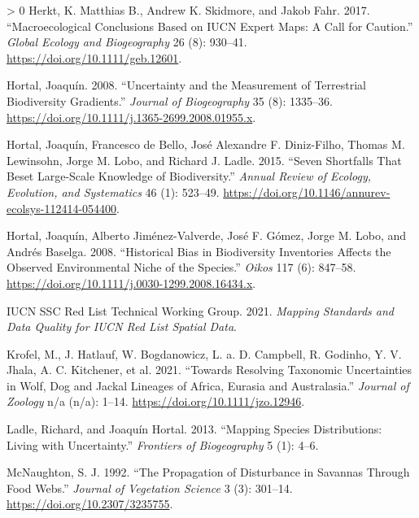 \documentclass[10pt,oneside]{article}
\newlength{\cslhangindent}
\newenvironment{CSLReferences}[3] %
 {%
  \setlength{\parindent}{0pt}
  \ifodd #1 \everypar{\setlength{\hangindent}{\cslhangindent}}\ignorespaces\fi
  \ifnum #2 > 0
  \setlength{\parskip}{#2\baselineskip}
  \fi
 }%
 {}
\begin{document}
\begin{CSLReferences}{1}{0}
\leavevmode\hypertarget{ref-Herkt2017MacCon}{}%
Herkt, K. Matthias B., Andrew K. Skidmore, and Jakob Fahr. 2017.
{``Macroecological Conclusions Based on IUCN Expert Maps: A Call for
Caution.''} \emph{Global Ecology and Biogeography} 26 (8): 930--41.
\url{https://doi.org/10.1111/geb.12601}.

\leavevmode\hypertarget{ref-Hortal2008UncMea}{}%
Hortal, Joaquín. 2008. {``Uncertainty and the Measurement of Terrestrial
Biodiversity Gradients.''} \emph{Journal of Biogeography} 35 (8):
1335--36. \url{https://doi.org/10.1111/j.1365-2699.2008.01955.x}.

\leavevmode\hypertarget{ref-Hortal2015SevSho}{}%
Hortal, Joaquín, Francesco de Bello, José Alexandre F. Diniz-Filho,
Thomas M. Lewinsohn, Jorge M. Lobo, and Richard J. Ladle. 2015. {``Seven
Shortfalls That Beset Large-Scale Knowledge of Biodiversity.''}
\emph{Annual Review of Ecology, Evolution, and Systematics} 46 (1):
523--49. \url{https://doi.org/10.1146/annurev-ecolsys-112414-054400}.

\leavevmode\hypertarget{ref-Hortal2008HisBia}{}%
Hortal, Joaquín, Alberto Jiménez-Valverde, José F. Gómez, Jorge M. Lobo,
and Andrés Baselga. 2008. {``Historical Bias in Biodiversity Inventories
Affects the Observed Environmental Niche of the Species.''} \emph{Oikos}
117 (6): 847--58.
\url{https://doi.org/10.1111/j.0030-1299.2008.16434.x}.

\leavevmode\hypertarget{ref-IUCNSSCRedListTechnicalWorkingGroup2021MapSta}{}%
IUCN SSC Red List Technical Working Group. 2021. \emph{Mapping Standards
and Data Quality for IUCN Red List Spatial Data}.

\leavevmode\hypertarget{ref-Krofel2021ResTax}{}%
Krofel, M., J. Hatlauf, W. Bogdanowicz, L. a. D. Campbell, R. Godinho,
Y. V. Jhala, A. C. Kitchener, et al. 2021. {``Towards Resolving
Taxonomic Uncertainties in Wolf, Dog and Jackal Lineages of Africa,
Eurasia and Australasia.''} \emph{Journal of Zoology} n/a (n/a): 1--14.
\url{https://doi.org/10.1111/jzo.12946}.

\leavevmode\hypertarget{ref-Ladle2013MapSpe}{}%
Ladle, Richard, and Joaquín Hortal. 2013. {``Mapping Species
Distributions: Living with Uncertainty.''} \emph{Frontiers of
Biogeography} 5 (1): 4--6.

\leavevmode\hypertarget{ref-McNaughton1992ProDis}{}%
McNaughton, S. J. 1992. {``The Propagation of Disturbance in Savannas
Through Food Webs.''} \emph{Journal of Vegetation Science} 3 (3):
301--14. \url{https://doi.org/10.2307/3235755}.


\end{CSLReferences}
\end{document}
